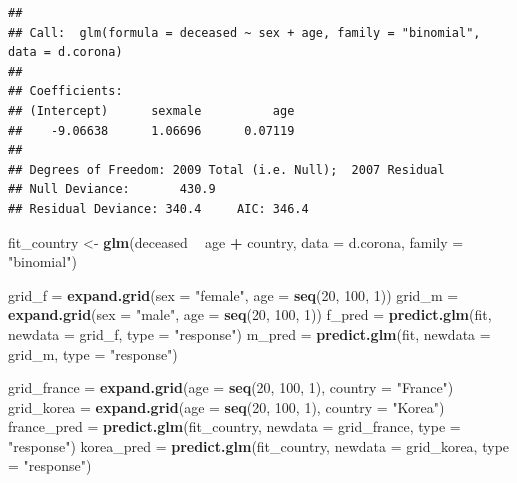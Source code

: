 \documentclass[
]{article}
\newenvironment{Shaded}{\begin{snugshade}}{\end{snugshade}}
\newcommand{\DataTypeTok}[1]{\textcolor[rgb]{0.13,0.29,0.53}{#1}}
\newcommand{\DecValTok}[1]{\textcolor[rgb]{0.00,0.00,0.81}{#1}}
\newcommand{\KeywordTok}[1]{\textcolor[rgb]{0.13,0.29,0.53}{\textbf{#1}}}
\newcommand{\NormalTok}[1]{#1}
\newcommand{\OperatorTok}[1]{\textcolor[rgb]{0.81,0.36,0.00}{\textbf{#1}}}
\newcommand{\StringTok}[1]{\textcolor[rgb]{0.31,0.60,0.02}{#1}}
\begin{document}
\begin{verbatim}
## 
## Call:  glm(formula = deceased ~ sex + age, family = "binomial", data = d.corona)
## 
## Coefficients:
## (Intercept)      sexmale          age  
##    -9.06638      1.06696      0.07119  
## 
## Degrees of Freedom: 2009 Total (i.e. Null);  2007 Residual
## Null Deviance:       430.9 
## Residual Deviance: 340.4     AIC: 346.4
\end{verbatim}

\begin{Shaded}
\begin{Highlighting}[]
\NormalTok{fit_country <-}\StringTok{ }\KeywordTok{glm}\NormalTok{(deceased }\OperatorTok{~}\StringTok{ }\NormalTok{age }\OperatorTok{+}\StringTok{ }\NormalTok{country, }\DataTypeTok{data =}\NormalTok{ d.corona, }\DataTypeTok{family =} \StringTok{"binomial"}\NormalTok{)}

\NormalTok{grid_f =}\StringTok{ }\KeywordTok{expand.grid}\NormalTok{(}\DataTypeTok{sex =} \StringTok{"female"}\NormalTok{, }\DataTypeTok{age =} \KeywordTok{seq}\NormalTok{(}\DecValTok{20}\NormalTok{, }\DecValTok{100}\NormalTok{, }\DecValTok{1}\NormalTok{))}
\NormalTok{grid_m =}\StringTok{ }\KeywordTok{expand.grid}\NormalTok{(}\DataTypeTok{sex =} \StringTok{"male"}\NormalTok{, }\DataTypeTok{age =} \KeywordTok{seq}\NormalTok{(}\DecValTok{20}\NormalTok{, }\DecValTok{100}\NormalTok{, }\DecValTok{1}\NormalTok{))}
\NormalTok{f_pred =}\StringTok{ }\KeywordTok{predict.glm}\NormalTok{(fit, }\DataTypeTok{newdata =}\NormalTok{ grid_f, }\DataTypeTok{type =} \StringTok{"response"}\NormalTok{)}
\NormalTok{m_pred =}\StringTok{ }\KeywordTok{predict.glm}\NormalTok{(fit, }\DataTypeTok{newdata =}\NormalTok{ grid_m, }\DataTypeTok{type =} \StringTok{"response"}\NormalTok{)}

\NormalTok{grid_france =}\StringTok{ }\KeywordTok{expand.grid}\NormalTok{(}\DataTypeTok{age =} \KeywordTok{seq}\NormalTok{(}\DecValTok{20}\NormalTok{, }\DecValTok{100}\NormalTok{, }\DecValTok{1}\NormalTok{), }\DataTypeTok{country =} \StringTok{"France"}\NormalTok{)}
\NormalTok{grid_korea =}\StringTok{ }\KeywordTok{expand.grid}\NormalTok{(}\DataTypeTok{age =} \KeywordTok{seq}\NormalTok{(}\DecValTok{20}\NormalTok{, }\DecValTok{100}\NormalTok{, }\DecValTok{1}\NormalTok{), }\DataTypeTok{country =} \StringTok{"Korea"}\NormalTok{)}
\NormalTok{france_pred =}\StringTok{ }\KeywordTok{predict.glm}\NormalTok{(fit_country, }\DataTypeTok{newdata =}\NormalTok{ grid_france, }\DataTypeTok{type =} \StringTok{"response"}\NormalTok{)}
\NormalTok{korea_pred =}\StringTok{ }\KeywordTok{predict.glm}\NormalTok{(fit_country, }\DataTypeTok{newdata =}\NormalTok{ grid_korea, }\DataTypeTok{type =} \StringTok{"response"}\NormalTok{)}
\end{Highlighting}
\end{Shaded}
\end{document}
